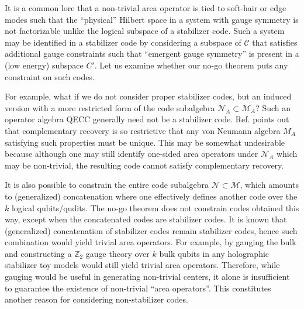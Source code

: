 \documentclass[a4paper,11pt]{article}
\theoremstyle{definition}
\numberwithin{equation}{section}
\begin{document}
It is a common lore that a non-trivial area operator is tied to soft-hair or edge modes such that the ``physical'' Hilbert space in a system with gauge symmetry is not factorizable unlike the logical subspace of a stabilizer code\cite{Buividovich:2008gq,Donnelly:2011hn,Casini:2013rba,Lin:2017uzr}. Such a system may be identified in a stabilizer code by considering a subspace of $\mathcal{C}$ that satisfies additional gauge constraints such that ``emergent gauge symmetry'' is present in a (low energy) subspace $C'$\cite{Levin:2004mi,Dolev:2021ofc,Qi:2022lbd}. Let us examine whether our no-go theorem puts any constraint on such codes. 


For example, what if we do not consider proper stabilizer codes, but an induced version with a more  restricted form of the code subalgebra $\mathcal{N}_A\subset \mathcal{M}_A$? Such an operator algebra QECC generally need not be a stabilizer code. Ref. \cite{Pollack:2021yij} points out that complementary recovery is so restrictive that any von Neumann algebra $M_A$ satisfying such properties must be unique. This may be somewhat undesirable because although one may still identify one-sided area operators under $\mathcal{N}_A$ which may be non-trivial, the resulting code cannot satisfy complementary recovery. 

It is also possible to constrain the entire code subalgebra $\mathcal{N}\subset\mathcal{M}$, which amounts to (generalized) concatenation where one effectively defines another code over the $k$ logical qubits/qudits. The no-go theorem does not constrain codes obtained this way, except when the concatenated codes are stabilizer codes. It is known that (generalized) concatenation of stabilizer codes remain stabilizer codes\cite{QL}, hence such combination would yield trivial area operators. For example, by gauging the bulk and constructing a $\mathbb{Z}_2$ gauge theory over $k$ bulk qubits in any holographic stabilizer toy models would still yield trivial area operators. Therefore, while gauging would be useful in generating non-trivial centers, it alone is insufficient to guarantee the existence of non-trivial ``area operators''. This constitutes another reason for considering non-stabilizer codes.
\end{document}
